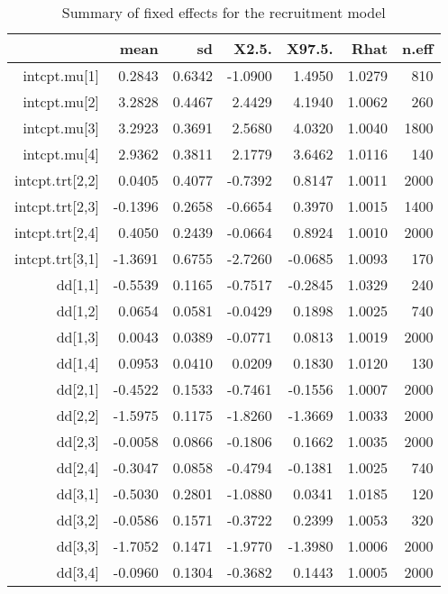 \begin{table}[ht]
\centering
\caption{Summary of fixed effects for the recruitment model} 
\label{table:recruitment}
\begin{tabular}{rrrrrrr}
  \hline
 & mean & sd & X2.5. & X97.5. & Rhat & n.eff \\ 
  \hline
intcpt.mu[1] & 0.2843 & 0.6342 & -1.0900 & 1.4950 & 1.0279 &   810 \\ 
  intcpt.mu[2] & 3.2828 & 0.4467 & 2.4429 & 4.1940 & 1.0062 &   260 \\ 
  intcpt.mu[3] & 3.2923 & 0.3691 & 2.5680 & 4.0320 & 1.0040 &  1800 \\ 
  intcpt.mu[4] & 2.9362 & 0.3811 & 2.1779 & 3.6462 & 1.0116 &   140 \\ 
  intcpt.trt[2,2] & 0.0405 & 0.4077 & -0.7392 & 0.8147 & 1.0011 &  2000 \\ 
  intcpt.trt[2,3] & -0.1396 & 0.2658 & -0.6654 & 0.3970 & 1.0015 &  1400 \\ 
  intcpt.trt[2,4] & 0.4050 & 0.2439 & -0.0664 & 0.8924 & 1.0010 &  2000 \\ 
  intcpt.trt[3,1] & -1.3691 & 0.6755 & -2.7260 & -0.0685 & 1.0093 &   170 \\ 
  dd[1,1] & -0.5539 & 0.1165 & -0.7517 & -0.2845 & 1.0329 &   240 \\ 
  dd[1,2] & 0.0654 & 0.0581 & -0.0429 & 0.1898 & 1.0025 &   740 \\ 
  dd[1,3] & 0.0043 & 0.0389 & -0.0771 & 0.0813 & 1.0019 &  2000 \\ 
  dd[1,4] & 0.0953 & 0.0410 & 0.0209 & 0.1830 & 1.0120 &   130 \\ 
  dd[2,1] & -0.4522 & 0.1533 & -0.7461 & -0.1556 & 1.0007 &  2000 \\ 
  dd[2,2] & -1.5975 & 0.1175 & -1.8260 & -1.3669 & 1.0033 &  2000 \\ 
  dd[2,3] & -0.0058 & 0.0866 & -0.1806 & 0.1662 & 1.0035 &  2000 \\ 
  dd[2,4] & -0.3047 & 0.0858 & -0.4794 & -0.1381 & 1.0025 &   740 \\ 
  dd[3,1] & -0.5030 & 0.2801 & -1.0880 & 0.0341 & 1.0185 &   120 \\ 
  dd[3,2] & -0.0586 & 0.1571 & -0.3722 & 0.2399 & 1.0053 &   320 \\ 
  dd[3,3] & -1.7052 & 0.1471 & -1.9770 & -1.3980 & 1.0006 &  2000 \\ 
  dd[3,4] & -0.0960 & 0.1304 & -0.3682 & 0.1443 & 1.0005 &  2000 \\ 

\end{tabular}
\end{table}

